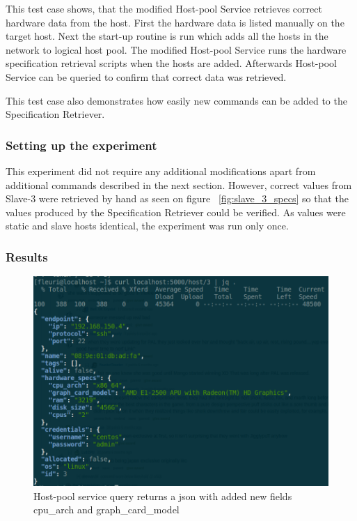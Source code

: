 This test case shows, that the modified Host-pool Service retrieves correct hardware data from the host. First the hardware data is listed manually on the target host. Next the start-up routine is run which adds all the hosts in the network to logical host pool. The modified Host-pool Service runs the hardware specification retrieval scripts when the hosts are added. Afterwards Host-pool Service can be queried to confirm that correct data was retrieved.

This test case also demonstrates how easily new commands can be added to the Specification Retriever.

\subsubsection*{Setting up the experiment}

This experiment did not require any additional modifications apart from additional commands described in the next section. However, correct values from Slave-3 were retrieved by hand as seen on figure ~\ref{fig:slave_3_specs} so that the values produced by the Specification Retriever could be verified. As values were static and slave hosts identical, the experiment was run only once.

\subsubsection*{Results}

 \begin{figure}[ht!]
\centering
  \includegraphics[width=\textwidth, keepaspectratio]{masterqueryscreenshot.png}%
  \caption{Host-pool service query returns a json with added new fields cpu\_arch and graph\_card\_model}
  \label{fig:master_query}
\end{figure}

